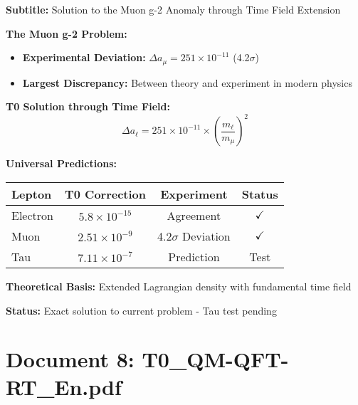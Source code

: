\documentclass[12pt,a4paper]{article}
\begin{document}
	\begin{documentbox}
		\textbf{Subtitle:} Solution to the Muon g-2 Anomaly through Time Field Extension
		
		\textbf{The Muon g-2 Problem:}
		\begin{itemize}
			\item \textbf{Experimental Deviation:} $\Delta a_\mu = 251 \times 10^{-11}$ (4.2$\sigma$)
			\item \textbf{Largest Discrepancy:} Between theory and experiment in modern physics
		\end{itemize}
		
		\textbf{T0 Solution through Time Field:}
		\begin{equation}
			\boxed{\Delta a_\ell = 251 \times 10^{-11} \times \left(\frac{m_\ell}{m_\mu}\right)^2}
		\end{equation}
		
		\textbf{Universal Predictions:}
		\begin{center}
			\begin{tabular}{lccc}
				\toprule
				\textbf{Lepton} & \textbf{T0 Correction} & \textbf{Experiment} & \textbf{Status} \\
				\midrule
				Electron & $5.8 \times 10^{-15}$ & Agreement & $\checkmark$ \\
				Muon & $2.51 \times 10^{-9}$ & 4.2$\sigma$ Deviation & $\checkmark$ \\
				Tau & $7.11 \times 10^{-7}$ & Prediction & Test \\
				\bottomrule
			\end{tabular}
		\end{center}
		
		\textbf{Theoretical Basis:} Extended Lagrangian density with fundamental time field
		
		\textbf{Status:} Exact solution to current problem - Tau test pending
	\end{documentbox}
	
	\section{Document 8: T0\_QM-QFT-RT\_En.pdf}
	
\end{document}
